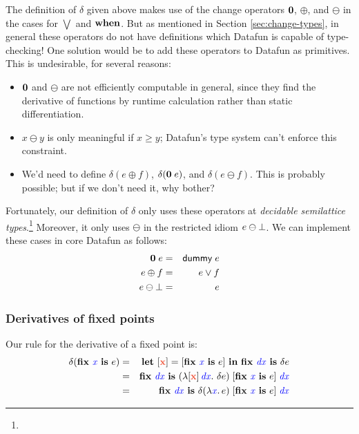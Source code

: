 \documentclass{article}
\theoremstyle{plain}
\theoremstyle{definition}
\newcommand{\dummy}{\ms{dummy}}
\begin{document}
The definition of $\delta$ given above makes use of the change operators $\mathbf{0}$, $\oplus$, and $\ominus$ in the cases for $\bigvee$ and $\mathbf{when}$.
%
But as mentioned in Section \ref{sec:change-types}, in general these operators do not have definitions which Datafun is capable of type-checking!
%
One solution would be to add these operators to Datafun as primitives.
%
This is undesirable, for several reasons:
\begin{itemize}
\item $\mathbf{0}$ and $\ominus$ are not efficiently computable in general, since
  they find the derivative of functions by runtime calculation rather than
  static differentiation.

\item $x \ominus y$ is only meaningful if $x \ge y$; Datafun's type system
  can't enforce this constraint.

\item We'd need to define $\delta(e \oplus f)$, $\delta(\mathbf{0}\;e)$, and
  $\delta(e \ominus f)$. This is probably possible; but if we don't need it, why
  bother?
\end{itemize}

Fortunately, our definition of $\delta$ only uses these operators at \emph{decidable semilattice types}.\footnote{} Moreover, it only uses $\ominus$ in the restricted idiom $e \ominus \bot$. We can implement these cases in core Datafun as follows:
%
\begin{eqnarray*}
  \zero\; e &=& \dummy\; e\\
  e \oplus f &=& e \vee f\\
  e \ominus \unit &=& e
\end{eqnarray*}



\subsubsection{Derivatives of fixed points}

Our rule for the derivative of a fixed point is:
\begin{eqnarray*}
  \delta(\fix{\m{x}} e)
  &=& \letdisc{\d{x}}{\disc{\fix{\m{x}} e}} \fix{\m{dx}} \delta e\\
  &=& \fix{\m{dx}}
      (\fn \disc{\d{x}}\, \m{dx}\binder\, \delta e)
      \; \disc{\fix{\m{x}} e}
      \; \m{dx}\\
  &=& \fix{\m{dx}} \delta(\lam{\m{x}} e)
      \; \disc{\fix{\m{x}} e}
      \; \m{dx}
\end{eqnarray*}
\end{document}
